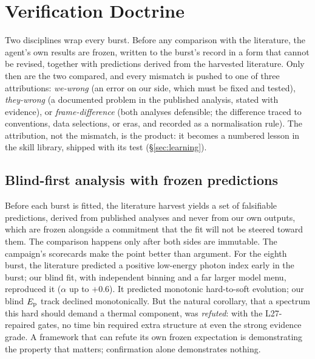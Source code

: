 \section{Verification Doctrine} \label{sec:verify}\label{sec:doctrine}

Two disciplines wrap every burst. Before any comparison with the
literature, the agent's own results are frozen, written to the burst's
record in a form that cannot be revised, together with predictions derived
from the harvested literature. Only then are the two compared, and every
mismatch is pushed to one of three attributions: \emph{we-wrong} (an error
on our side, which must be fixed and tested), \emph{they-wrong} (a
documented problem in the published analysis, stated with evidence), or
\emph{frame-difference} (both analyses defensible; the difference traced to
conventions, data selections, or eras, and recorded as a normalisation
rule). The attribution, not the mismatch, is the product: it becomes a
numbered lesson in the skill library, shipped with its test
(\S\ref{sec:learning}).

\subsection{Blind-first analysis with frozen predictions}

Before each burst is fitted, the literature harvest yields a set of
falsifiable predictions, derived from published analyses and never from
our own outputs, which are frozen alongside a commitment that the fit will
not be steered toward them. The comparison happens only after both sides
are immutable. The campaign's scorecards make the point better than
argument. For the eighth burst, the literature predicted a positive
low-energy photon index early in the burst; our blind fit, with independent
binning and a far larger model menu, reproduced it ($\alpha$ up to
$+0.6$\prov). It predicted monotonic hard-to-soft evolution; our blind
$E_{\rm p}$ track declined monotonically\prov. But the natural corollary, that a
spectrum this hard should demand a thermal component, was \emph{refuted}:
with the L27-repaired gates, no time bin required extra structure at even
the strong evidence grade\prov. A framework that can refute its own frozen
expectation is demonstrating the property that matters; confirmation alone
demonstrates nothing.

